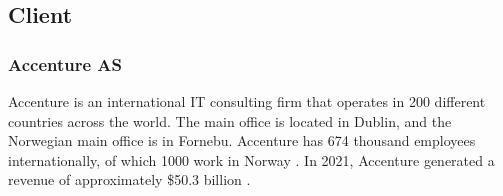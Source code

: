\subsection{Client}
\subsubsection*{Accenture AS}

Accenture is an international IT consulting firm that operates in 200 different countries across the world. The main office is located in Dublin, and the Norwegian main office is in Fornebu. Accenture has 674 thousand employees internationally, of which 1000 work in Norway \parencite{accenture_earning_report_2021}. In 2021, Accenture generated a revenue of approximately \$50.3 billion \parencite{accenture_about}.
